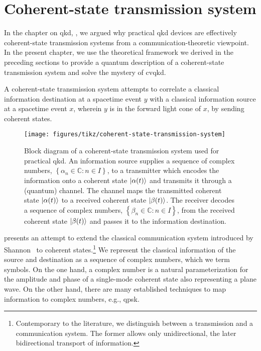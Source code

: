 \chapter{Coherent-state transmission system}\label{ch:system}

In the chapter on \gls{qkd}, , we argued why practical \gls{qkd} devices are effectively coherent-state transmission systems from a communication-theoretic viewpoint.
In the present chapter, we use the theoretical framework we derived in the preceding sections to provide a quantum description of a coherent-state transmission system and solve the mystery of \gls{cvqkd}.

A coherent-state transmission system attempts to correlate a classical information destination at a spacetime event $y$ with a classical information source at a spacetime event $x$, wherein $y$ is in the forward light cone of $x$, by sending coherent states.
\begin{figure}[htb]
	\centering
	\texttt{[image: figures/tikz/coherent-state-transmission-system]}
	\caption{Block diagram of a coherent-state transmission system used for practical \gls{qkd}. An information source supplies a sequence of complex numbers, $\left\{\alpha_n\in\mathbb{C}\colon n\in I\right\}$, to a transmitter which encodes the information onto a coherent state $\lvert\alpha(t)\rangle$ and transmits it through a (quantum) channel. The channel maps the transmitted coherent state $\lvert\alpha(t)\rangle$ to a received coherent state $\lvert\beta(t)\rangle$. The receiver decodes a sequence of complex numbers, $\left\{\beta_n\in\mathbb{C}\colon n\in I\right\}$, from the received coherent state $\lvert\beta(t)\rangle$ and passes it to the information destination.}\label{fig:coherent_state_transmission_system}
\end{figure}
 presents an attempt to extend the classical communication system introduced by Shannon~\cite{Shannon1948} to coherent states.\footnote{Contemporary to the literature, we distinguish between a transmission and a communication system. The former allows only unidirectional, the later bidirectional transport of information.}
We represent the classical information of the source and destination as a sequence of complex numbers, which we term symbols.
On the one hand, a complex number is a natural parameterization for the amplitude and phase of a single-mode coherent state also representing a plane wave.
On the other hand, there are many established techniques to map information to complex numbers, e.g., \gls{qpsk}.
